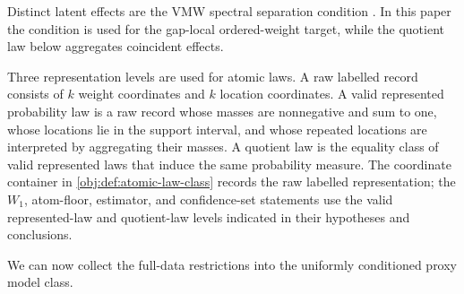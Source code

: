 Distinct latent effects are the VMW spectral separation condition \citep{VirkMazaheriWu2026}. In this paper the condition is used for the gap-local ordered-weight target, while the quotient law below aggregates coincident effects.

Three representation levels are used for atomic laws. A raw labelled record consists of \(k\) weight coordinates and \(k\) location coordinates. A valid represented probability law is a raw record whose masses are nonnegative and sum to one, whose locations lie in the support interval, and whose repeated locations are interpreted by aggregating their masses. A quotient law is the equality class of valid represented laws that induce the same probability measure. The coordinate container in \cref{obj:def:atomic-law-class} records the raw labelled representation; the \(W_1\), atom-floor, estimator, and confidence-set statements use the valid represented-law and quotient-law levels indicated in their hypotheses and conclusions.

We can now collect the full-data restrictions into the uniformly conditioned proxy model class.

